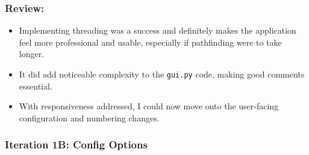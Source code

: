 \subsubsection{Review:}
\begin{itemize}
	\item Implementing threading was a success and definitely makes the application feel more professional and usable, especially if pathfinding were to take longer.
	\item It did add noticeable complexity to the \verb|gui.py| code, making good comments essential.
	\item With responsiveness addressed, I could now move onto the user-facing configuration and numbering changes.
\end{itemize}

\newpage

\subsubsection{Iteration 1B: Config Options}


